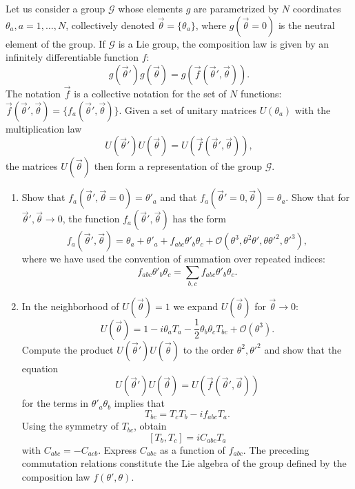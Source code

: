 \documentclass[letterpaper,11pt]{article}
\begin{document}
\begin{enumerate}
  Let us consider a group $\mathcal{G}$ whose elements $g$ are parametrized by $N$ coordinates $\theta_a, a = 1,\ldots,N$, collectively denoted $\vec{\theta} = \{ \theta_a \}$, where $g(\vec\theta = 0)$ is the neutral element of the group. If $\mathcal{G}$ is a Lie group, the composition law is given by an infinitely differentiable function $f$:
  $$ g(\vec\theta') g(\vec\theta) = g(\vec{f}(\vec\theta',\vec\theta)). $$
  The notation $\vec{f}$ is a collective notation for the set of $N$ functions: $\vec{f}(\vec\theta',\vec\theta) = \{ f_a(\vec\theta',\vec\theta) \}$. Given a set of unitary matrices $U(\theta_a)$ with the multiplication law
  $$ U(\vec\theta') U(\vec\theta) = U(\vec{f}(\vec\theta',\vec\theta)), $$
  the matrices $U(\vec\theta)$ then form a representation of the group $\mathcal{G}$.
  \begin{enumerate}
    \item Show that $f_a(\vec\theta',\vec\theta=0) = \theta'_a$ and that $f_a(\vec\theta'=0,\vec\theta) = \theta_a$. Show that for $\vec\theta',\vec\theta \to 0$, the function $f_a(\vec\theta',\vec\theta)$ has the form
    $$ f_a(\vec\theta',\vec\theta) = \theta_a + \theta'_a + f_{abc} \theta'_b \theta_c + \mathcal{O}(\theta^3,\theta^2\theta',\theta\theta'^2,\theta'^3), $$
    where we have used the convention of summation over repeated indices:
    $$ f_{abc} \theta'_b \theta_c = \sum_{b,c} f_{abc} \theta'_b \theta_c. $$
    \item In the neighborhood of $U(\vec\theta) = 1$ we expand $U(\vec\theta)$ for $\vec\theta \to 0$:
    $$ U(\vec\theta) = 1 - i\theta_a T_a - \frac{1}{2} \theta_b \theta_c T_{bc} + \mathcal{O}(\theta^3). $$
    Compute the product $U(\vec\theta') U(\vec\theta)$ to the order $\theta^2,\theta'^2$ and show that the equation
    $$ U(\vec\theta') U(\vec\theta) = U(\vec{f}(\vec\theta',\vec\theta)) $$
    for the terms in $\theta'_a \theta_b$ implies that
    $$ T_{bc} = T_c T_b - i f_{abc} T_a. $$
    Using the symmetry of $T_{bc}$, obtain
    $$ [T_b, T_c] = i C_{abc} T_a $$
    with $C_{abc} = -C_{acb}$. Express $C_{abc}$ as a function of $f_{abc}$. The preceding commutation relations constitute the Lie algebra of the group defined by the composition law $f(\theta',\theta)$.
  \end{enumerate}
\end{enumerate}
\end{document}
